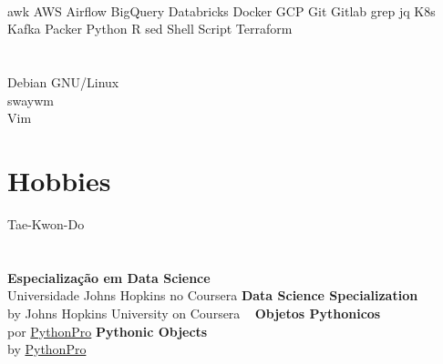 \documentclass[]{friggeri-cv}
\begin{document}
\begin{aside}
~
~
~
  \section{}
    awk
    AWS
    Airflow
    BigQuery
    Databricks
    Docker
    GCP
    Git
    Gitlab
    grep
    jq
    K8s
    Kafka
    Packer
    Python
    R
    sed
    Shell Script
    Terraform
  ~
  \section{}
    Debian GNU/Linux \\%
    swaywm \\%
    Vim
  ~
  \section{Hobbies}
      \href{http://olhares.com/diraol}{}
      Tae-Kwon-Do
  ~
  \section{}
      {\textbf{Especialização em Data Science}\\{\scriptsize{Universidade Johns Hopkins no Coursera}}}%
      {\textbf{Data Science Specialization}\\{\scriptsize{by Johns Hopkins University on Coursera}}}
      ~
      {\textbf{Objetos Pythonicos}\\{\scriptsize{por \href{https://www.python.pro.br/modulos/}{PythonPro}}}}%
      {\textbf{Pythonic Objects}\\{\scriptsize{by \href{https://www.python.pro.br/modulos/}{PythonPro}}}}
\end{aside}
\end{document}
